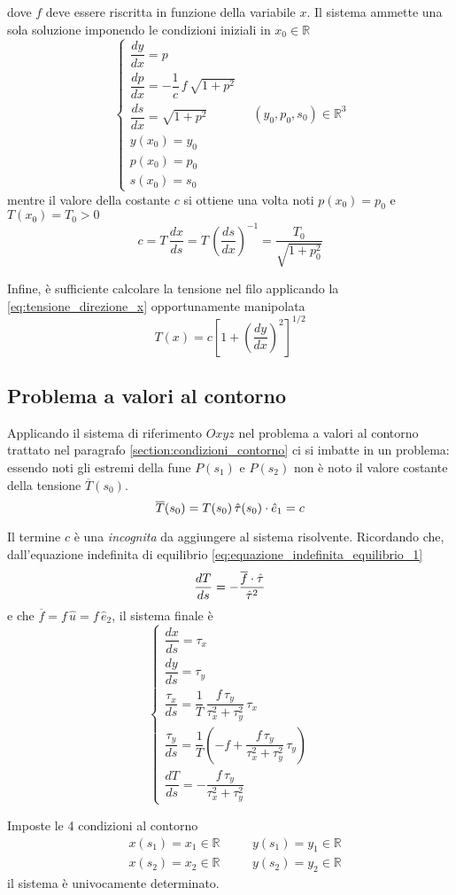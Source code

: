 dove $f$ deve essere riscritta in funzione della variabile $x$. Il sistema ammette una sola soluzione imponendo le condizioni iniziali in $x_0\in\mathbb{R}$
\[
\begin{cases}
	\dfrac{dy}{dx} = p\\[1.5ex]	
	\dfrac{dp}{dx} = -\dfrac{1}{c}\,f\,\sqrt{1+p^2}\\[1.5ex]
	\dfrac{ds}{dx} = \sqrt{1+p^2}\\[1.5ex]
	y(x_0) = y_0\\
	p(x_0) = p_0\\
	s(x_0) = s_0
\end{cases}\quad (y_0,p_0,s_0)\in\mathbb{R}^3
\]
mentre il valore della costante $c$ si ottiene una volta noti $p(x_0) = p_0$ e $T(x_0) = T_0>0$
\[
c = T\,\dfrac{dx}{ds} = T\,\left(\dfrac{ds}{dx}\right)^{-1} = \dfrac{T_0}{\sqrt{1+p_0^2}}
\]

Infine, è sufficiente calcolare la tensione nel filo applicando la \eqref{eq:tensione_direzione_x} opportunamente manipolata
\begin{equation}
	\label{eq:calcolo_tensione}
	T(x) = c\left[1+ \left(\dfrac{dy}{dx}\right)^2\right]^{1/2}
\end{equation}

\subsection{Problema a valori al contorno}
Applicando il sistema di riferimento $Oxyz$ nel problema a valori al contorno trattato nel paragrafo \ref{section:condizioni_contorno} ci si imbatte in un problema: essendo noti gli estremi della fune $P(s_1)$ e $P(s_2)$ non è noto il valore costante della tensione $\overline{T}(s_0)$. 
\[
\overline{T}(s_0)	= T(s_0)\,\hat{\tau} (s_0)\cdot\hat{e}_1 = c 
\]

Il termine $c$ è una \emph{incognita} da aggiungere al sistema risolvente. Ricordando che, dall'equazione indefinita di equilibrio \eqref{eq:equazione_indefinita_equilibrio_1}
\[
	\dfrac{dT}{ds} = -\dfrac{\overline{f}\cdot\hat{\tau}}{\hat{\tau}^2}
\]
e che $\overline{f} = f\,\hat{u} = f\,\hat{e}_2$, il sistema finale è
\[
	\begin{cases}
\dfrac{dx}{ds} = \tau_x\\[1.5ex]
\dfrac{dy}{ds} = \tau_y\\[1.5ex]
\dfrac{\tau_x}{ds} = \dfrac{1}{T}\,\dfrac{f\,\tau_y}{\tau_x^2 + \tau_y^2}\,\tau_x\\[1.5ex]
\dfrac{\tau_y}{ds} = \dfrac{1}{T}\left(-f+\dfrac{f\,\tau_y}{\tau_x^2 + \tau_y^2}\,\tau_y\right)\\[1.5ex]
\dfrac{dT}{ds} = -\dfrac{f\,\tau_y}{\tau_x^2 + \tau_y^2}
	\end{cases}
\]

Imposte le 4 condizioni al contorno
\begin{align*}
	&x(s_1) = x_1\in\mathbb{R} \quad &&y(s_1) = y_1\in\mathbb{R}\\
	&x(s_2) = x_2\in\mathbb{R} \quad &&y(s_2) = y_2\in\mathbb{R}
\end{align*}
il sistema è univocamente determinato.
